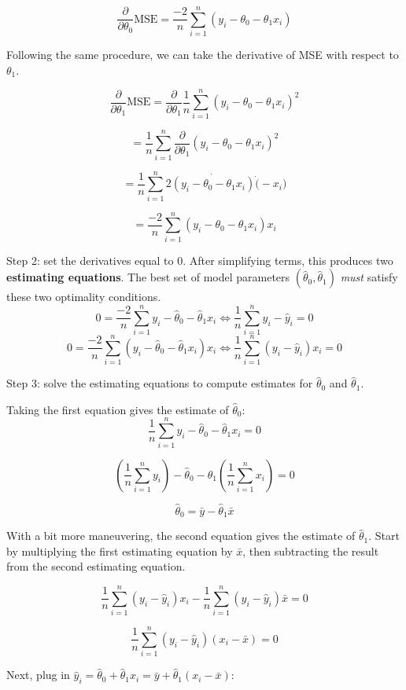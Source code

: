 \documentclass[
  letterpaper,
  DIV=11,
  numbers=noendperiod]{scrreprt}
\begin{document}
\[\frac{\partial}{\partial \theta_0} \text{MSE} = \frac{-2}{n} \sum_{i=1}^{n}{(y_i - \theta_0 - \theta_1 x_i)}\]

Following the same procedure, we can take the derivative of MSE with
respect to \(\theta_1\).

\[\frac{\partial}{\partial \theta_1} \text{MSE} = \frac{\partial}{\partial \theta_1} \frac{1}{n} \sum_{i=1}^{n} {(y_i - \theta_0 - \theta_1 x_i)}^{2}\]

\[ = \frac{1}{n} \sum_{i=1}^{n} \frac{\partial}{\partial \theta_1} {(y_i - \theta_0 - \theta_1 x_i)}^{2}\]

\[ = \frac{1}{n} \sum_{i=1}^{n} 2 \dot{(y_i - \theta_0 - \theta_1 x_i)}\dot(-x_i)\]

\[= \frac{-2}{n} \sum_{i=1}^{n} {(y_i - \theta_0 - \theta_1 x_i)}x_i\]

Step 2: set the derivatives equal to 0. After simplifying terms, this
produces two \textbf{estimating equations}. The best set of model
parameters \((\hat{\theta}_0, \hat{\theta}_1)\) \emph{must} satisfy
these two optimality conditions.
\[0 = \frac{-2}{n} \sum_{i=1}^{n} y_i - \hat{\theta}_0 - \hat{\theta}_1 x_i \Longleftrightarrow \frac{1}{n}\sum_{i=1}^{n} y_i - \hat{y}_i = 0\]
\[0 = \frac{-2}{n} \sum_{i=1}^{n} (y_i - \hat{\theta}_0 - \hat{\theta}_1 x_i)x_i \Longleftrightarrow \frac{1}{n}\sum_{i=1}^{n} (y_i - \hat{y}_i)x_i = 0\]

Step 3: solve the estimating equations to compute estimates for
\(\hat{\theta}_0\) and \(\hat{\theta}_1\).

Taking the first equation gives the estimate of \(\hat{\theta}_0\):
\[\frac{1}{n} \sum_{i=1}^n y_i - \hat{\theta}_0 - \hat{\theta}_1 x_i = 0 \]

\[\left(\frac{1}{n} \sum_{i=1}^n y_i \right) - \hat{\theta}_0 - \hat{\theta}_1\left(\frac{1}{n} \sum_{i=1}^n x_i \right) = 0\]

\[ \hat{\theta}_0 = \bar{y} - \hat{\theta}_1 \bar{x}\]

With a bit more maneuvering, the second equation gives the estimate of
\(\hat{\theta}_1\). Start by multiplying the first estimating equation
by \(\bar{x}\), then subtracting the result from the second estimating
equation.

\[\frac{1}{n} \sum_{i=1}^n (y_i - \hat{y}_i)x_i - \frac{1}{n} \sum_{i=1}^n (y_i - \hat{y}_i)\bar{x} = 0 \]

\[\frac{1}{n} \sum_{i=1}^n (y_i - \hat{y}_i)(x_i - \bar{x}) = 0 \]

Next, plug in
\(\hat{y}_i = \hat{\theta}_0 + \hat{\theta}_1 x_i = \bar{y} + \hat{\theta}_1(x_i - \bar{x})\):
\end{document}
